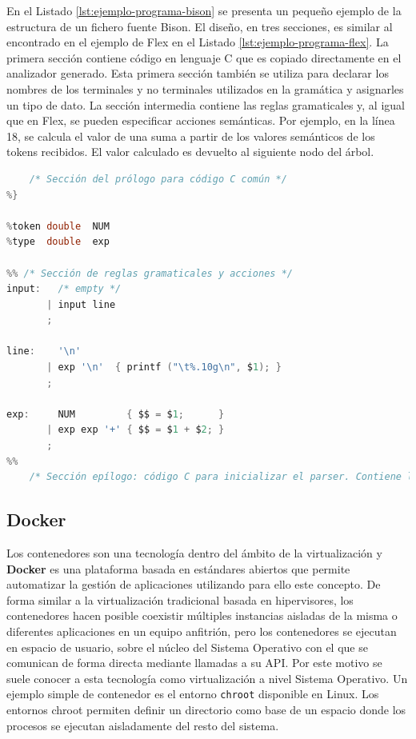 

En el Listado \ref{lst:ejemplo-programa-bison} se presenta un pequeño ejemplo de la estructura de un fichero fuente Bison. El diseño, en tres secciones, es similar al encontrado en el ejemplo de Flex en el Listado \ref{lst:ejemplo-programa-flex}. La primera sección contiene código en lenguaje C que es copiado directamente en el analizador generado. Esta primera sección también se utiliza para declarar los nombres de los terminales y no terminales utilizados en la gramática y asignarles un tipo de dato. La sección intermedia contiene las reglas gramaticales y, al igual que en Flex, se pueden especificar acciones semánticas. Por ejemplo, en la línea 18, se calcula el valor de una suma a partir de los valores semánticos de los tokens recibidos. El valor calculado es devuelto al siguiente nodo del árbol.

\begin{lstlisting}[language=C,caption={Ejemplo de programa Bison \cite{mit_web_bisonExample}},label=lst:ejemplo-programa-bison]
%{
    /* Sección del prólogo para código C común */
%}

%token double  NUM
%type  double  exp

%% /* Sección de reglas gramaticales y acciones */
input:   /* empty */
       | input line
       ;

line:    '\n'
       | exp '\n'  { printf ("\t%.10g\n", $1); }
       ;
    
exp:     NUM         { $$ = $1;      }
       | exp exp '+' { $$ = $1 + $2; }
       ;
%%
    /* Sección epílogo: código C para inicializar el parser. Contiene la función main() */
\end{lstlisting}

\subsection{Docker}

Los contenedores son una tecnología dentro del ámbito de la virtualización y \textbf{Docker} es una plataforma basada en estándares abiertos que permite automatizar la gestión de aplicaciones utilizando para ello este concepto. De forma similar a la virtualización tradicional basada en \gls{hipervisores}, los contenedores hacen posible coexistir múltiples instancias aisladas de la misma o diferentes aplicaciones en un  equipo anfitrión, pero los contenedores se ejecutan en espacio de usuario, sobre el núcleo del Sistema Operativo con el que se comunican de forma directa mediante llamadas a su API. Por este motivo se suele conocer a esta tecnología como virtualización a nivel Sistema Operativo. Un ejemplo simple de contenedor es el entorno \verb|chroot| disponible en Linux. Los entornos chroot permiten definir un directorio como base de un espacio donde los procesos se ejecutan aisladamente del resto del sistema. 

